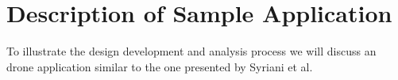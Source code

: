 

\section{Description of Sample Application}

To illustrate the design development and analysis process we will discuss an drone application similar to 
the one presented by Syriani et al.~\cite{Syriani_2019}